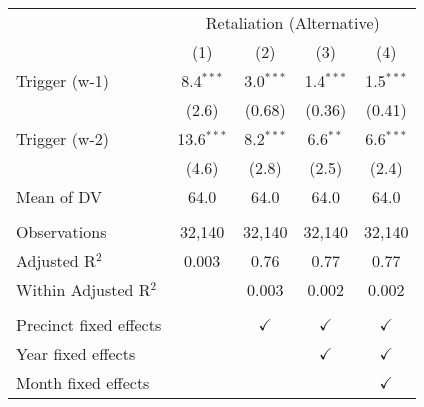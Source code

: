 \begingroup \centering \begin{tabular}{lcccc}    \toprule     & \multicolumn{4}{c}{Retaliation (Alternative)}\\                           & (1)          & (2)           & (3)           & (4)\\      \midrule     Trigger (w-1)          & 8.4$^{***}$  & 3.0$^{***}$   & 1.4$^{***}$   & 1.5$^{***}$\\                              & (2.6)        & (0.68)        & (0.36)        & (0.41)\\       Trigger (w-2)          & 13.6$^{***}$ & 8.2$^{***}$   & 6.6$^{**}$    & 6.6$^{***}$\\                              & (4.6)        & (2.8)         & (2.5)         & (2.4)\\       Mean of DV             & 64.0         & 64.0          & 64.0          & 64.0\\       \\    Observations           & 32,140       & 32,140        & 32,140        & 32,140\\      Adjusted R$^2$         & 0.003        & 0.76          & 0.77          & 0.77\\      Within Adjusted R$^2$  &              & 0.003         & 0.002         & 0.002\\       \\    Precinct fixed effects &              & $\checkmark$  & $\checkmark$  & $\checkmark$\\       Year fixed effects     &              &               & $\checkmark$  & $\checkmark$\\       Month fixed effects    &              &               &               & $\checkmark$\\       \bottomrule \end{tabular} \par\endgroup